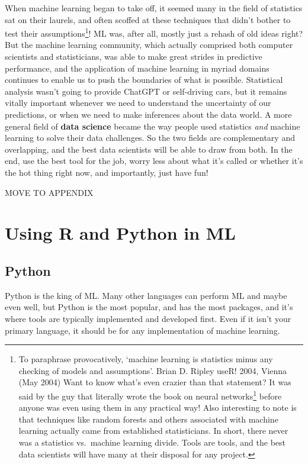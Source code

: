 \documentclass[
  letterpaper,
]{krantz}
\DeclareRobustCommand{\href}[2]{#2\footnote{\url{#1}}}
\begin{document}
When machine learning began to take off, it seemed many in the field of
statistics sat on their laurels, and often scoffed at these techniques
that didn't bother to test their assumptions\footnote{To paraphrase
  provocatively, `machine learning is statistics minus any checking of
  models and assumptions'. Brian D. Ripley useR! 2004, Vienna (May 2004)
  Want to know what's even crazier than that statement? It was said by
  the guy that literally
  \href{https://www.cambridge.org/core/books/pattern-recognition-and-neural-networks/4E038249C9BAA06C8F4EE6F044D09C5C}{wrote
  the book on neural networks} before anyone was even using them in any
  practical way! Also interesting to note is that techniques like random
  forests and others associated with machine learning actually came from
  established statisticians. In short, there never was a statistics
  vs.~machine learning divide. Tools are tools, and the best data
  scientists will have many at their disposal for any project.}! ML was,
after all, mostly just a rehash of old ideas right? But the machine
learning community, which actually comprised both computer scientists
and statisticians, was able to make great strides in predictive
performance, and the application of machine learning in myriad domains
continues to enable us to push the boundaries of what is possible.
Statistical analysis wasn't going to provide ChatGPT or self-driving
cars, but it remains vitally important whenever we need to understand
the uncertainty of our predictions, or when we need to make inferences
about the data world. A more general field of \textbf{data science}
became the way people used statistics \emph{and} machine learning to
solve their data challenges. So the two fields are complementary and
overlapping, and the best data scientists will be able to draw from
both. In the end, use the best tool for the job, worry less about what
it's called or whether it's the hot thing right now, and importantly,
just have fun!

MOVE TO APPENDIX

\section{Using R and Python in ML}\label{using-r-and-python-in-ml}

\subsection{Python}\label{python-30}

Python is the king of ML. Many other languages can perform ML and maybe
even well, but Python is the most popular, and has the most packages,
and it's where tools are typically implemented and developed first. Even
if it isn't your primary language, it should be for any implementation
of machine learning.
\end{document}
